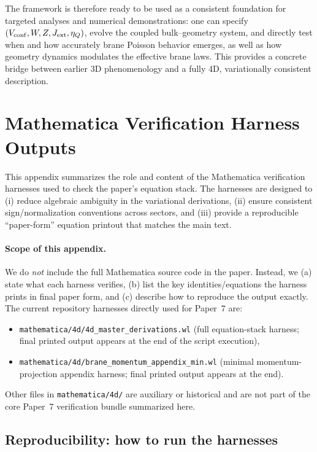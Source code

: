 \documentclass[11pt]{article}
\newcommand{\etaQ}{\eta_Q}
\begin{document}
The framework is therefore ready to be used as a consistent foundation for targeted analyses and numerical demonstrations: one can specify $(V_{\rm conf},W,Z,J_{\rm ext},\etaQ)$, evolve the coupled bulk--geometry system, and directly test when and how accurately brane Poisson behavior emerges, as well as how geometry dynamics modulates the effective brane laws. This provides a concrete bridge between earlier 3D phenomenology and a fully 4D, variationally consistent description.

\appendix

\section{Mathematica Verification Harness Outputs}
\label{app:wl}

This appendix summarizes the role and content of the Mathematica verification harnesses used to check the paper’s equation stack. The harnesses are designed to (i) reduce algebraic ambiguity in the variational derivations, (ii) ensure consistent sign/normalization conventions across sectors, and (iii) provide a reproducible “paper-form” equation printout that matches the main text.

\paragraph{Scope of this appendix.}
We do \emph{not} include the full Mathematica source code in the paper. Instead, we (a) state what each harness verifies, (b) list the key identities/equations the harness prints in final paper form, and (c) describe how to reproduce the output exactly. The current repository harnesses directly used for Paper~7 are:
\begin{itemize}[leftmargin=2.0em]
\item \texttt{mathematica/4d/4d\_master\_derivations.wl} (full equation-stack harness; final printed output appears at the end of the script execution),
\item \texttt{mathematica/4d/brane\_momentum\_appendix\_min.wl} (minimal momentum-projection appendix harness; final printed output appears at the end).
\end{itemize}
Other files in \texttt{mathematica/4d/} are auxiliary or historical and are not part of the core Paper~7 verification bundle summarized here.

\subsection{Reproducibility: how to run the harnesses}
\label{app:wl-repro}
\end{document}
